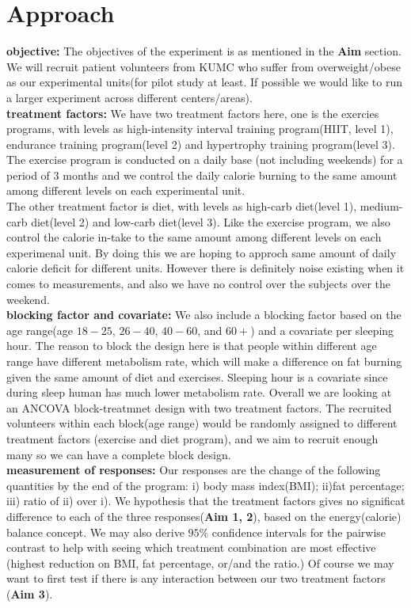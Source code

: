 \documentclass[11pt]{article}  %
\begin{document}
\section{Approach}
\textbf{objective: }The objectives of the experiment is as mentioned in the \textbf{Aim} section. We will recruit patient volunteers from KUMC who suffer from overweight/obese as our experimental units(for pilot study at least. If possible we would like to run a larger experiment across different centers/areas). \\
\textbf{treatment factors: }We have two treatment factors here, one is the exercies programs, with levels as high-intensity interval training program(HIIT, level 1), endurance training program(level 2) and hypertrophy training program(level 3). The exercise program is conducted on a daily base (not including weekends) for a period of 3 months and we control the daily calorie burning to the same amount among different levels on each experimental unit.\\
The other treatment factor is diet, with levels as high-carb diet(level 1), medium-carb diet(level 2) and low-carb diet(level 3). Like the exercise program, we also control the calorie in-take to the same amount among different levels on each experimenal unit. By doing this we are hoping to approch same amount of daily calorie deficit for different units. However there is definitely noise existing when it comes to measurements, and also we have no control over the subjects over the weekend.\\
\textbf{blocking factor and covariate: }We also include a blocking factor based on the age range(age $18-25$, $26-40$, $40-60$, and $60+$) and a covariate per sleeping hour. The reason to block the design here is that people within different age range have different metabolism rate, which will make a difference on fat burning given the same amount of diet and exercises. Sleeping hour is a covariate since during sleep human has much lower metabolism rate. Overall we are looking at an ANCOVA block-treatmnet design with two treatment factors. The recruited volunteers within each block(age range) would be randomly assigned to different treatment factors (exercise and diet program), and we aim to recruit enough many so we can have a complete block design.\\
\textbf{measurement of responses: }Our responses are the change of the following quantities by the end of the program: i) body mass index(BMI); ii)fat percentage; iii) ratio of ii) over i).  We hypothesis that the treatment factors gives no significat difference to each of the three responses(\textbf{Aim 1, 2}), based on the energy(calorie) balance concept. We may also derive $95\%$ confidence intervals for the pairwise contrast to help with seeing which treatment combination are most effective (highest reduction on BMI, fat percentage, or/and the ratio.) Of course we may want to first test if there is any interaction between our two treatment factors (\textbf{Aim 3}). \\
\end{document}
